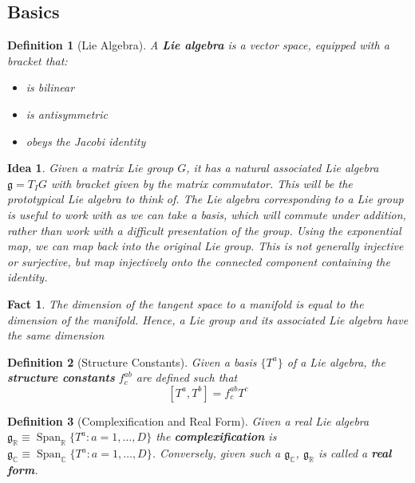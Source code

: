 \documentclass{article}
\newtheorem{definition}{Definition}[subsection]
\newtheorem{fact}{Fact}[subsection]
\newtheorem*{idea}{Idea}
\DeclareMathOperator{\spn}{Span}
\newcommand{\bam}[1]{\textbf{#1}}
\newcommand{\mf}[1]{\mathfrak{#1}}
\newcommand{\comm}[2][]{\left[ #1, #2 \right]}
\begin{document}
\subsection{Basics}

\begin{definition}[Lie Algebra] 

A \bam{Lie algebra} is a vector space, equipped with a bracket that:
\begin{itemize}
    \item is bilinear
    \item is antisymmetric
    \item obeys the Jacobi identity
\end{itemize}
\end{definition}

\begin{idea}
Given a matrix Lie group $G$, it has a natural associated Lie algebra $\mf{g}=T_{I}G$ with bracket given by the matrix commutator. This will be the prototypical Lie algebra to think of. The Lie algebra corresponding to a Lie group is useful to work with as we can take a basis, which will commute under addition, rather than work with a difficult presentation of the group.
Using the exponential map, we can map back into the original Lie group. This is not generally injective or surjective, but map injectively onto the connected component containing the identity. 
\end{idea}

\begin{fact}
The dimension of the tangent space to a manifold is equal to the dimension of the manifold. Hence, a Lie group and its associated Lie algebra have the same dimension
\end{fact}

\begin{definition}[Structure Constants]
Given a basis $\lbrace T^a \rbrace$ of a Lie algebra, the \bam{structure constants} $f^{ab}_c$ are defined such that 
\[
\comm[T^a]{T^b}=f^{ab}_c T^c
\]
\end{definition}

\begin{definition}[Complexification and Real Form]
Given a  real Lie algebra $\mf{g}_\mathbb{R}\equiv\spn_{\mathbb{R}}\lbrace T^a : a=1, \dots, D \rbrace$ the \bam{complexification}
is $\mf{g}_\mathbb{C}\equiv\spn_{\mathbb{C}}\lbrace T^a : a=1, \dots, D \rbrace$. Conversely, given such a $\mf{g}_\mathbb{C}$, $\mf{g}_\mathbb{R}$ is called a \bam{real form}.  
\end{definition}
\end{document}
